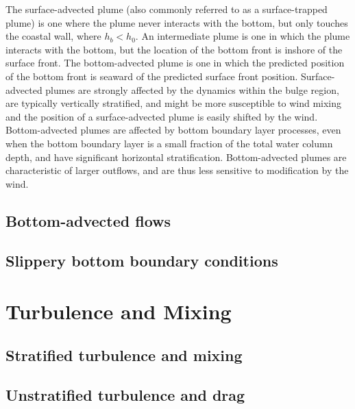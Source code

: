 \documentclass[11pt]{report}
\numberwithin{equation}{section}
\begin{document}
The surface-advected plume (also commonly referred to as a surface-trapped plume) is one where the plume never interacts with the bottom, but only touches the coastal wall, where $h_b < h_0$.  An intermediate plume is one in which the plume interacts with the bottom, but the location of the bottom front is inshore of the surface front.  The bottom-advected plume is one in which the predicted position of the bottom front is seaward of the predicted surface front position.  Surface-advected plumes are strongly affected by the dynamics within the bulge region, are typically vertically stratified, and might be more susceptible to wind mixing and the position of a surface-advected plume is easily shifted by the wind.  Bottom-advected plumes are affected by bottom boundary layer processes, even when the bottom boundary layer is a small fraction of the total water column depth, and have significant horizontal stratification.  Bottom-advected plumes are characteristic of larger outflows, and are thus less sensitive to modification by the wind.


\section{Bottom-advected flows}

\section{Slippery bottom boundary conditions}



\chapter{Turbulence and Mixing}
\label{chapter:turbulence}

\section{Stratified turbulence and mixing}

\section{Unstratified turbulence and drag}
\end{document}
